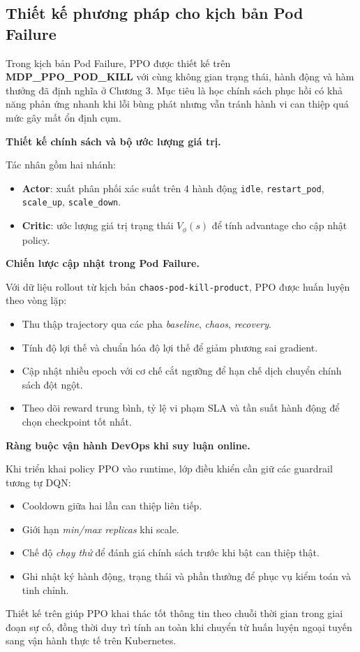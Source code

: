 \subsection{Thiết kế phương pháp cho kịch bản Pod Failure}

\noindent Trong kịch bản Pod Failure, PPO được thiết kế trên \textbf{MDP\_PPO\_POD\_KILL} với cùng không gian trạng thái, hành động và hàm thưởng đã định nghĩa ở Chương 3. Mục tiêu là học chính sách phục hồi có khả năng phản ứng nhanh khi lỗi bùng phát nhưng vẫn tránh hành vi can thiệp quá mức gây mất ổn định cụm.

\noindent\textbf{Thiết kế chính sách và bộ ước lượng giá trị.}

\noindent Tác nhân gồm hai nhánh:
\begin{itemize}
    \item \textbf{Actor}: xuất phân phối xác suất trên 4 hành động \texttt{idle}, \texttt{restart\_pod}, \texttt{scale\_up}, \texttt{scale\_down}.
    \item \textbf{Critic}: ước lượng giá trị trạng thái $V_\phi(s)$ để tính advantage cho cập nhật policy.
\end{itemize}

\noindent\textbf{Chiến lược cập nhật trong Pod Failure.}

\noindent Với dữ liệu rollout từ kịch bản \texttt{chaos-pod-kill-product}, PPO được huấn luyện theo vòng lặp:
\begin{itemize}
    \item Thu thập trajectory qua các pha \textit{baseline}, \textit{chaos}, \textit{recovery}.
    \item Tính độ lợi thế và chuẩn hóa độ lợi thế để giảm phương sai gradient.
    \item Cập nhật nhiều epoch với cơ chế cắt ngưỡng để hạn chế dịch chuyển chính sách đột ngột.
    \item Theo dõi reward trung bình, tỷ lệ vi phạm SLA và tần suất hành động để chọn checkpoint tốt nhất.
\end{itemize}

\noindent\textbf{Ràng buộc vận hành DevOps khi suy luận online.}

\noindent Khi triển khai policy PPO vào runtime, lớp điều khiển cần giữ các guardrail tương tự DQN:
\begin{itemize}
    \item Cooldown giữa hai lần can thiệp liên tiếp.
    \item Giới hạn \textit{min/max replicas} khi scale.
    \item Chế độ \textit{chạy thử} để đánh giá chính sách trước khi bật can thiệp thật.
    \item Ghi nhật ký hành động, trạng thái và phần thưởng để phục vụ kiểm toán và tinh chỉnh.
\end{itemize}

\noindent Thiết kế trên giúp PPO khai thác tốt thông tin theo chuỗi thời gian trong giai đoạn sự cố, đồng thời duy trì tính an toàn khi chuyển từ huấn luyện ngoại tuyến sang vận hành thực tế trên Kubernetes.
